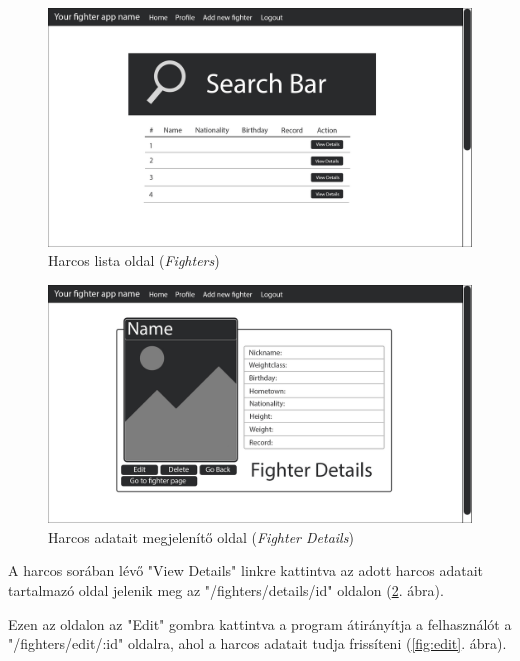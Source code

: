 \begin{figure}[htb]
\centering
\includegraphics[scale=0.7]{kepek/search_bar.jpg}
\caption{Harcos lista oldal (\textit{Fighters})}
\label{fig:search_bar}
\end{figure}

\begin{figure}[htb]
\centering
\includegraphics[scale=0.7]{kepek/details.jpg}
\caption{Harcos adatait megjelenítő oldal (\textit{Fighter Details})}
\label{fig:details}
\end{figure}

A harcos sorában lévő "View Details" linkre kattintva az adott harcos adatait tartalmazó oldal jelenik meg az "/fighters/details/id" oldalon (\ref{fig:details}. ábra).

Ezen az oldalon az "Edit" gombra kattintva a program átirányítja a felhasználót a "/fighters/edit/:id" oldalra, ahol a harcos adatait tudja frissíteni (\ref{fig:edit}. ábra).

